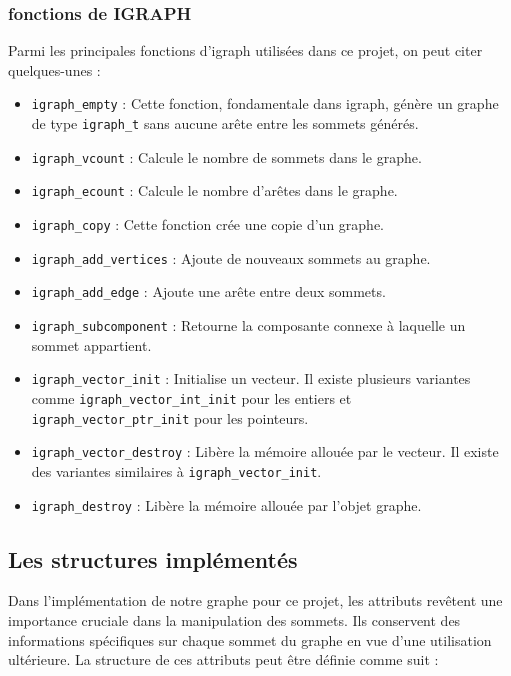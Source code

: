 \subsubsection{fonctions de IGRAPH}

Parmi les principales fonctions d'igraph utilisées dans ce projet, on peut citer quelques-unes :

\begin{itemize}
    \item \texttt{igraph\_empty} : Cette fonction, fondamentale dans igraph, génère un graphe de type \texttt{igraph\_t} sans aucune arête entre les sommets générés.
    \item \texttt{igraph\_vcount} : Calcule le nombre de sommets dans le graphe.
    \item \texttt{igraph\_ecount} : Calcule le nombre d'arêtes dans le graphe.
    \item \texttt{igraph\_copy} : Cette fonction crée une copie d'un graphe.
    \item \texttt{igraph\_add\_vertices} : Ajoute de nouveaux sommets au graphe.
    \item \texttt{igraph\_add\_edge} : Ajoute une arête entre deux sommets.
    \item \texttt{igraph\_subcomponent} : Retourne la composante connexe à laquelle un sommet appartient.
    \item \texttt{igraph\_vector\_init} : Initialise un vecteur. Il existe plusieurs variantes comme \texttt{igraph\_vector\_int\_init} pour les entiers et \texttt{igraph\_vector\_ptr\_init} pour les pointeurs.
    \item \texttt{igraph\_vector\_destroy} : Libère la mémoire allouée par le vecteur. Il existe des variantes similaires à \texttt{igraph\_vector\_init}.
    \item \texttt{igraph\_destroy} : Libère la mémoire allouée par l'objet graphe.
\end{itemize}

\subsection{Les structures implémentés}
Dans l'implémentation de notre graphe pour ce projet, les attributs revêtent une importance cruciale dans la manipulation des sommets. Ils conservent des informations spécifiques sur chaque sommet du graphe en vue d'une utilisation ultérieure. La structure de ces attributs peut être définie comme suit :

